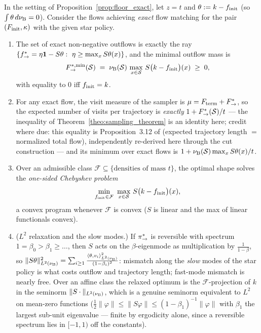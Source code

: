 \begin{proposition}\label{prop:shape_cost}
In the setting of Proposition~\ref{prop:floor_exact}, let $z=t$ and
$\theta:=k-f_{\mathrm{init}}$ (so $\int\theta\,d\nu_{\mathrm{B}}=0$). Consider the flows achieving
\emph{exact} flow matching for the pair $(F_{\mathrm{init}},\kappa)$ with the given star policy.
\begin{enumerate}
    \item The set of exact non-negative outflows is exactly the ray
    $\{\foutstar=\eta\mathbf 1-S\theta:\ \eta\geq\max_xS\theta(x)\}$, and the minimal
    outflow mass is
    \begin{equation}\label{equ:min_outflow}
        F^{*,\min}_{\rightarrow}(\mathcal S)\;=\;\nu_{\mathrm{B}}(\mathcal S)\,
        \max_{x\in\mathcal S}\,S\bigl(k-f_{\mathrm{init}}\bigr)(x)\;\geq\;0,
    \end{equation}
    with equality to $0$ iff $f_{\mathrm{init}}=k$.
    \item For any exact flow, the visit measure of the sampler is
    $\mu=F_{\mathrm{term}}+F^*_{\rightarrow}$, so the expected number of visits per trajectory is
    \emph{exactly} $1+F^*_{\rightarrow}(\mathcal S)/t$ --- the inequality of
    Theorem~\ref{theo:sampling_theorem} is an identity here; credit where due: this
    equality is Proposition~3.12 of \citet{morozov2025revisiting} (expected trajectory
    length $=$ normalized total flow), independently re-derived here through the cut
    construction --- and its minimum over exact flows is
    $1+\nu_{\mathrm{B}}(\mathcal S)\max_xS\theta(x)/t$.
    \item Over an admissible class $\mathcal F\subseteq\{\text{densities of mass }t\}$,
    the optimal shape solves the \emph{one-sided Chebyshev problem}
    \begin{equation}\label{equ:chebyshev}
        \min_{\finit\in\mathcal F}\ \max_{x\in\Statespace}\,S\bigl(k-\finit\bigr)(x),
    \end{equation}
    a convex program whenever $\mathcal F$ is convex ($S$ is linear and the max of linear
    functionals convex).
    \item ($L^2$ relaxation and the slow modes.) If $\pi_{\rightarrow}^*$ is reversible
    with spectrum $1=\beta_0>\beta_1\geq\dots$, then $S$ acts on the $\beta$-eigenmode as
    multiplication by $\frac1{1-\beta}$, so
    $\|S\theta\|^2_{L^2(\nu_{\mathrm{B}})}=\sum_{i\geq1}\frac{\langle\theta,v_i\rangle^2_{L^2(\nu_{\mathrm{B}})}}{(1-\beta_i)^2}$:
    mismatch along the \emph{slow} modes of the star policy is what costs outflow and
    trajectory length; fast-mode mismatch is nearly free. Over an affine class the
    relaxed optimum is the $\mathcal F$-projection of $k$ in the seminorm $\|S\cdot\|_{L^2(\nu_{\mathrm{B}})}$,
    which is a genuine seminorm equivalent to $L^2$ on mean-zero functions
    ($\tfrac12\|\varphi\|\leq\|S\varphi\|\leq(1-\beta_1)^{-1}\|\varphi\|$ with $\beta_1$
    the largest sub-unit eigenvalue --- finite by ergodicity alone, since a reversible
    spectrum lies in $[-1,1)$ off the constants).
\end{enumerate}
\end{proposition}

